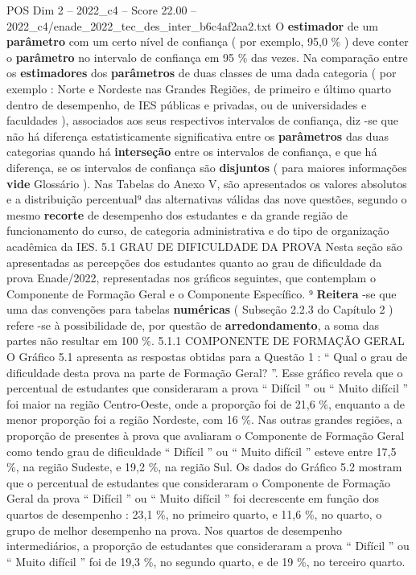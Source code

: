 \begin{textsample}{POS Dim 2 – 2022\_c4 – Score 22.00 – 2022\_c4/enade\_2022\_tec\_des\_inter\_b6c4af2aa2.txt}
O \textbf{estimador} de um \textbf{parâmetro} com um certo nível de confiança ( por exemplo, 95,0 \% ) deve conter o \textbf{parâmetro} no intervalo de confiança em 95 \% das vezes.
Na comparação entre os \textbf{estimadores} dos \textbf{parâmetros} de duas classes de uma dada categoria ( por exemplo : Norte e Nordeste nas Grandes Regiões, de primeiro e último quarto dentro de desempenho, de IES públicas e privadas, ou de universidades e faculdades ), associados aos seus respectivos intervalos de confiança, diz -se que não há diferença estatisticamente significativa entre os \textbf{parâmetros} das duas categorias quando há \textbf{interseção} entre os intervalos de confiança, e que há diferença, se os intervalos de confiança são \textbf{disjuntos} ( para maiores informações \textbf{vide} Glossário ).
Nas Tabelas do Anexo V, são apresentados os valores absolutos e a distribuição percentual⁹ das alternativas válidas das nove questões, segundo o mesmo \textbf{recorte} de desempenho dos estudantes e da grande região de funcionamento do curso, de categoria administrativa e do tipo de organização acadêmica da IES. 5.1 GRAU DE DIFICULDADE DA PROVA Nesta seção são apresentadas as percepções dos estudantes quanto ao grau de dificuldade da prova Enade/2022, representadas nos gráficos seguintes, que contemplam o Componente de Formação Geral e o Componente Específico. ⁹ \textbf{Reitera} -se que uma das convenções para tabelas \textbf{numéricas} ( Subseção 2.2.3 do Capítulo 2 ) refere -se à possibilidade de, por questão de \textbf{arredondamento}, a soma das partes não resultar em 100 \%. 5.1.1 COMPONENTE DE FORMAÇÃO GERAL O Gráfico 5.1 apresenta as respostas obtidas para a Questão 1 : “ Qual o grau de dificuldade desta prova na parte de Formação Geral? ”.
Esse gráfico revela que o percentual de estudantes que consideraram a prova “ Difícil ” ou “ Muito difícil ” foi maior na região Centro-Oeste, onde a proporção foi de 21,6 \%, enquanto a de menor proporção foi a região Nordeste, com 16 \%.
Nas outras grandes regiões, a proporção de presentes à prova que avaliaram o Componente de Formação Geral como tendo grau de dificuldade “ Difícil ” ou “ Muito difícil ” esteve entre 17,5 \%, na região Sudeste, e 19,2 \%, na região Sul.
Os dados do Gráfico 5.2 mostram que o percentual de estudantes que consideraram o Componente de Formação Geral da prova “ Difícil ” ou “ Muito difícil ” foi decrescente em função dos quartos de desempenho : 23,1 \%, no primeiro quarto, e 11,6 \%, no quarto, o grupo de melhor desempenho na prova.
Nos quartos de desempenho intermediários, a proporção de estudantes que consideraram a prova “ Difícil ” ou “ Muito difícil ” foi de 19,3 \%, no segundo quarto, e de 19 \%, no terceiro quarto.

\end{textsample}
